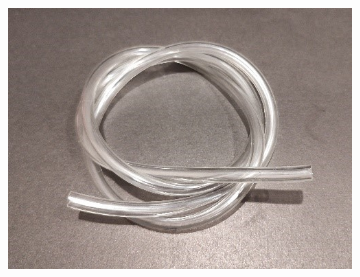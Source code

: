 \documentclass[twoside]{article}
\begin{document}
\begin{figure}[H]
\begin{subfigure}[b]{0.33\linewidth}
	\end{subfigure}%
	\begin{subfigure}[b]{0.25\linewidth}
		\centering
		\includegraphics[width=\textwidth]{pvc_tubing}
	\end{subfigure}
	

\end{figure}
\end{document}
